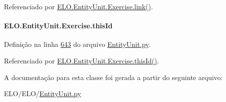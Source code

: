 Referenciado por \hyperlink{classELO_1_1EntityUnit_1_1Exercise_a655fe652bfb708878ab9725a9da18a10}{E\+L\+O.\+Entity\+Unit.\+Exercise.\+link()}.

\hypertarget{classELO_1_1EntityUnit_1_1Exercise_a6277daccaa7fe96d8f0a287002cea07a}{}
\paragraph[{this\+Id}]{\setlength{\rightskip}{0pt plus 5cm}E\+L\+O.\+Entity\+Unit.\+Exercise.\+this\+Id}\label{classELO_1_1EntityUnit_1_1Exercise_a6277daccaa7fe96d8f0a287002cea07a}


Definição na linha \hyperlink{EntityUnit_8py_source_l00643}{643} do arquivo \hyperlink{EntityUnit_8py_source}{Entity\+Unit.\+py}.



Referenciado por \hyperlink{classELO_1_1EntityUnit_1_1Exercise_a08d2177411dd803182cc9b22fb8951d3}{E\+L\+O.\+Entity\+Unit.\+Exercise.\+this\+Id()}.



A documentação para esta classe foi gerada a partir do seguinte arquivo\+:\begin{DoxyCompactItemize}
\item 
E\+L\+O/\+E\+L\+O/\hyperlink{EntityUnit_8py}{Entity\+Unit.\+py}\end{DoxyCompactItemize}
